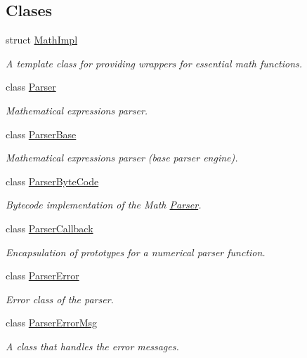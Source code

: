\subsection*{Clases}
\begin{DoxyCompactItemize}
\item 
struct \hyperlink{structmu_1_1_math_impl}{Math\+Impl}
\begin{DoxyCompactList}\small\item\em A template class for providing wrappers for essential math functions. \end{DoxyCompactList}\item 
class \hyperlink{classmu_1_1_parser}{Parser}
\begin{DoxyCompactList}\small\item\em Mathematical expressions parser. \end{DoxyCompactList}\item 
class \hyperlink{classmu_1_1_parser_base}{Parser\+Base}
\begin{DoxyCompactList}\small\item\em Mathematical expressions parser (base parser engine). \end{DoxyCompactList}\item 
class \hyperlink{classmu_1_1_parser_byte_code}{Parser\+Byte\+Code}
\begin{DoxyCompactList}\small\item\em Bytecode implementation of the Math \hyperlink{classmu_1_1_parser}{Parser}. \end{DoxyCompactList}\item 
class \hyperlink{classmu_1_1_parser_callback}{Parser\+Callback}
\begin{DoxyCompactList}\small\item\em Encapsulation of prototypes for a numerical parser function. \end{DoxyCompactList}\item 
class \hyperlink{classmu_1_1_parser_error}{Parser\+Error}
\begin{DoxyCompactList}\small\item\em Error class of the parser. \end{DoxyCompactList}\item 
class \hyperlink{classmu_1_1_parser_error_msg}{Parser\+Error\+Msg}
\begin{DoxyCompactList}\small\item\em A class that handles the error messages. \end{DoxyCompactList}\item 

\end{DoxyCompactItemize}
